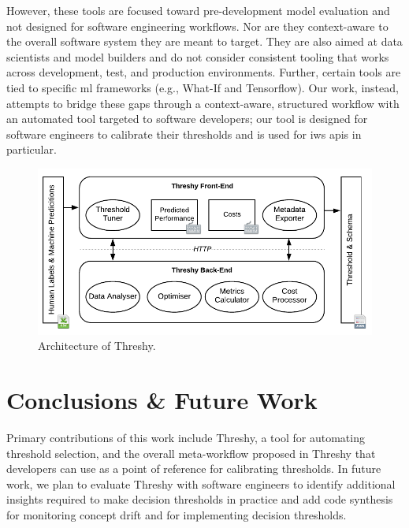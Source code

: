 However, these tools are focused toward pre-development model evaluation and not designed for software engineering workflows. Nor are they context-aware to the overall software system they are meant to target. They are also aimed at data scientists and model builders and do not consider consistent tooling that works across development, test, and production environments. Further, certain tools are tied to specific \gls{ml} frameworks (e.g., What-If and Tensorflow). Our work, instead, attempts to bridge these gaps through a context-aware, structured workflow with an automated tool targeted to software developers; our tool is designed for software engineers to calibrate their thresholds and is used for \gls{iws} \glspl{api} in particular.%

\begin{figure}[t!]
    \centering
    \includegraphics[width=.8\linewidth]{architecture.pdf}
    \caption{Architecture of Threshy.}
    \label{fig:implementation}
\end{figure}

\section{Conclusions \& Future Work}
\label{sec:conclusion}

Primary contributions of this work include Threshy, a tool for automating threshold selection, and the overall meta-workflow proposed in Threshy that developers can use as a point of reference for calibrating thresholds. In future work, we plan to evaluate Threshy with software engineers to identify additional insights required to make decision thresholds in practice and add code synthesis for monitoring concept drift and for implementing decision thresholds.
